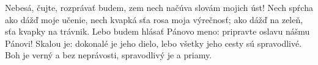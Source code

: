 Nebesá, čujte, rozprávať budem,
zem nech načúva slovám mojich úst!
\versseparator
Nech spŕcha ako dážď moje učenie,
nech kvapká sťa rosa moja výrečnosť;
ako dážď na zeleň,
\versseparator
sťa kvapky na trávnik.
Lebo budem hlásať Pánovo meno:
\versseparator
pripravte oslavu nášmu Pánovi!
Skalou je: dokonalé je jeho dielo,
lebo všetky jeho cesty sú spravodlivé.
\versseparator
Boh je verný a bez neprávosti,
spravodlivý je a priamy.